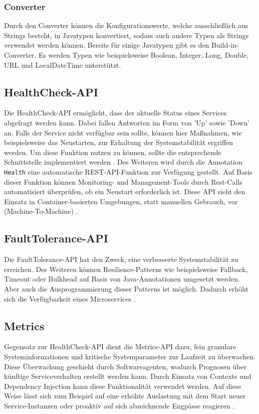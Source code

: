 \subsubsection{Converter}
Durch den Converter können die Konfigurationswerte, welche ausschließlich aus Strings besteht, in Javatypen konvertiert, sodass auch andere Typen als Strings verwendet werden können. Bereits für einige Javatypen gibt es den Build-in-Converter. Es werden Typen wie beispielsweise Boolean, Integer, Long, Double, URL und LocalDateTime unterstützt.

\subsection{HealthCheck-API} \label{healthcheck}
Die HealthCheck-API ermöglicht, dass der aktuelle Status eines Services abgefragt werden kann. Dabei fallen Antworten im Form von 'Up' sowie 'Down' an. Falls der Service nicht verfügbar sein sollte, können hier Maßnahmen, wie beispielsweise das Neustarten, zur Erhaltung der Systemstabilität ergriffen werden. Um diese Funktion nutzen zu können, sollte die entsprechende Schnittstelle implementiert werden \cite{LarsRowekamp.2017}. Des Weiteren wird durch die Annotation \texttt{\@ Health} eine automatische REST-API-Funktion zur Verfügung gestellt. Auf Basis dieser Funktion können Monitoring- und Management-Tools durch Rest-Calls automatisiert überprüfen, ob ein Neustart erforderlich ist. Diese API sieht den Einsatz in Container-basierten Umgebungen, statt manuellen Gebrauch, vor (Machine-To-Machine) \cite{LarsRowekamp.2017c}.  

\subsection{FaultTolerance-API} \label{faulttolerance}
Die FaultTolerance-API hat den Zweck, eine verbesserte Systemstabilität zu erreichen. Des Weiteren können Resilience-Patterns wie beispielsweise Fallback, Timeout oder Bulkhead auf Basis von Java-Annotationen umgesetzt werden. Aber auch die Ausprogrammierung dieser Patterns ist möglich. Dadurch erhöht sich die Verfügbarkeit eines Microservices \cite{ibm.2017}.

\subsection{Metrics}
Gegensatz zur HealthCheck-API dient die Metrics-API dazu, fein granulare Systeminformationen und kritische Systemparameter zur Laufzeit zu überwachen. Diese Überwachung geschieht durch Softwareagenten, wodurch Prognosen über künftige Serviceverhalten erstellt werden kann. Durch Einsatz von Contexts und Dependency Injection kann diese Funktionalität verwendet werden. Auf diese Weise lässt sich zum Beispiel auf eine erhöhte Auslastung mit dem Start neuer Service-Instanzen oder proaktiv auf sich abzeichnende Engpässe reagieren \cite{LarsRowekamp.2017c}. 

